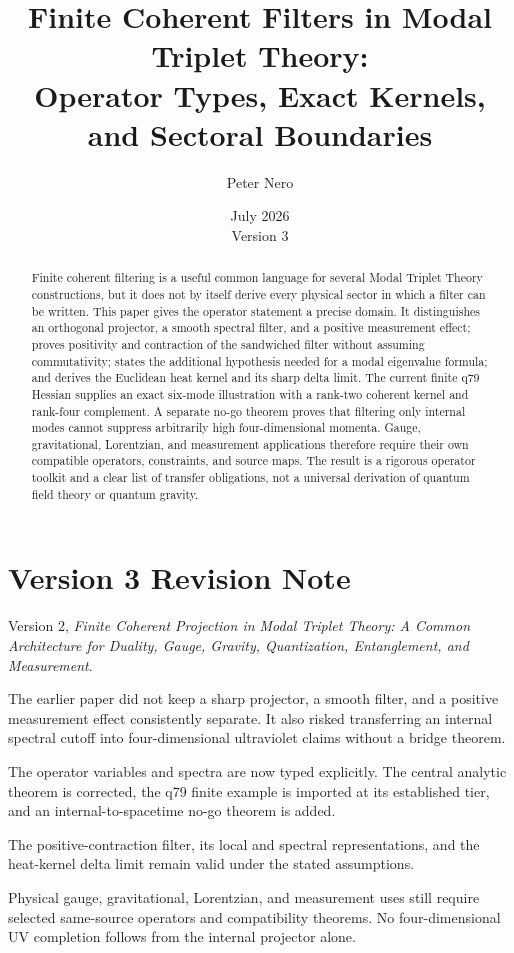 \documentclass[11pt]{article}
\title{Finite Coherent Filters in Modal Triplet Theory:\\
\large Operator Types, Exact Kernels, and Sectoral Boundaries}
\author{Peter Nero}
\date{July 2026\\Version 3}
\theoremstyle{definition}
\theoremstyle{remark}
\begin{document}
\maketitle

\begin{abstract}
Finite coherent filtering is a useful common language for several Modal
Triplet Theory constructions, but it does not by itself derive every physical
sector in which a filter can be written. This paper gives the operator
statement a precise domain. It distinguishes an orthogonal projector, a
smooth spectral filter, and a positive measurement effect; proves positivity
and contraction of the sandwiched filter without assuming commutativity;
states the additional hypothesis needed for a modal eigenvalue formula; and
derives the Euclidean heat kernel and its sharp delta limit. The current
finite q79 Hessian supplies an exact six-mode illustration with a rank-two
coherent kernel and rank-four complement. A separate no-go theorem proves
that filtering only internal modes cannot suppress arbitrarily high
four-dimensional momenta. Gauge, gravitational, Lorentzian, and measurement
applications therefore require their own compatible operators, constraints,
and source maps. The result is a rigorous operator toolkit and a clear list
of transfer obligations, not a universal derivation of quantum field theory
or quantum gravity.
\end{abstract}

\section*{Version 3 Revision Note}
\begin{description}[leftmargin=3.2cm,style=nextline]
\item[Supersedes] Version 2, \emph{Finite Coherent Projection in Modal
Triplet Theory: A Common Architecture for Duality, Gauge, Gravity,
Quantization, Entanglement, and Measurement}.
\item[Reason] The earlier paper did not keep a sharp projector, a smooth
filter, and a positive measurement effect consistently separate. It also
risked transferring an internal spectral cutoff into four-dimensional
ultraviolet claims without a bridge theorem.
\item[Resolution] The operator variables and spectra are now typed
explicitly. The central analytic theorem is corrected, the q79 finite
example is imported at its established tier, and an internal-to-spacetime
no-go theorem is added.
\item[Retained result] The positive-contraction filter, its local and
spectral representations, and the heat-kernel delta limit remain valid under
the stated assumptions.
\item[Remaining boundary] Physical gauge, gravitational, Lorentzian, and
measurement uses still require selected same-source operators and
compatibility theorems. No four-dimensional UV completion follows from the
internal projector alone.
\end{description}
\end{document}
